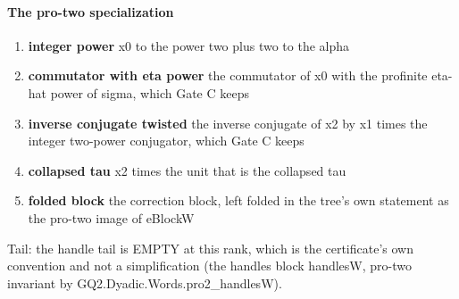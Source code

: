 \paragraph{The pro-two specialization}
\begin{enumerate}
\item[(1)] \textbf{integer power} x0 to the power two plus two to the alpha
\item[(2)] \textbf{commutator with eta power} the commutator of x0 with the profinite eta-hat power of sigma, which Gate C keeps
\item[(3)] \textbf{inverse conjugate twisted} the inverse conjugate of x2 by x1 times the integer two-power conjugator, which Gate C keeps
\item[(4)] \textbf{collapsed tau} x2 times the unit that is the collapsed tau
\item[(5)] \textbf{folded block} the correction block, left folded in the tree's own statement as the pro-two image of eBlockW
\end{enumerate}
Tail: the handle tail is EMPTY at this rank, which is the certificate's own convention and not a simplification (the handles block handlesW, pro-two invariant by GQ2.Dyadic.Words.pro2\_handlesW).
